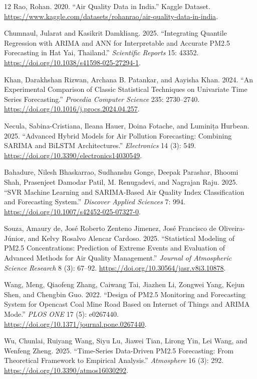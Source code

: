 \documentclass[11pt]{article}
\begin{document}
\begin{thebibliography}{12}
 Rao, Rohan. 2020. ``Air Quality Data in India.'' Kaggle Dataset. \url{https://www.kaggle.com/datasets/rohanrao/air-quality-data-in-india}.

 Chumnaul, Jularat and Kasikrit Damkliang. 2025. ``Integrating Quantile Regression with ARIMA and ANN for Interpretable and Accurate PM2.5 Forecasting in Hat Yai, Thailand.'' \textit{Scientific Reports} 15: 43352. \url{https://doi.org/10.1038/s41598-025-27294-1}.

 Khan, Darakhshan Rizwan, Archana B. Patankar, and Aayisha Khan. 2024. ``An Experimental Comparison of Classic Statistical Techniques on Univariate Time Series Forecasting.'' \textit{Procedia Computer Science} 235: 2730--2740. \url{https://doi.org/10.1016/j.procs.2024.04.257}.

 Necula, Sabina-Cristiana, Ileana Hauer, Doina Fotache, and Luminița Hurbean. 2025. ``Advanced Hybrid Models for Air Pollution Forecasting: Combining SARIMA and BiLSTM Architectures.'' \textit{Electronics} 14 (3): 549. \url{https://doi.org/10.3390/electronics14030549}.

 Bahadure, Nilesh Bhaskarrao, Sudhanshu Gonge, Deepak Parashar, Bhoomi Shah, Prasenjeet Damodar Patil, M. Renugadevi, and Nagrajan Raju. 2025. ``SVR Machine Learning and SARIMA-Based Air Quality Index Classification and Forecasting System.'' \textit{Discover Applied Sciences} 7: 994. \url{https://doi.org/10.1007/s42452-025-07327-0}.

 Souza, Amaury de, José Roberto Zenteno Jimenez, José Francisco de Oliveira-Júnior, and Kelvy Rosalvo Alencar Cardoso. 2025. ``Statistical Modeling of PM2.5 Concentrations: Prediction of Extreme Events and Evaluation of Advanced Methods for Air Quality Management.'' \textit{Journal of Atmospheric Science Research} 8 (3): 67--92. \url{https://doi.org/10.30564/jasr.v8i3.10878}.

 Wang, Meng, Qiaofeng Zhang, Caiwang Tai, Jiazhen Li, Zongwei Yang, Kejun Shen, and Chengbin Guo. 2022. ``Design of PM2.5 Monitoring and Forecasting System for Opencast Coal Mine Road Based on Internet of Things and ARIMA Mode.'' \textit{PLOS ONE} 17 (5): e0267440. \url{https://doi.org/10.1371/journal.pone.0267440}.

 Wu, Chunlai, Ruiyang Wang, Siyu Lu, Jiawei Tian, Lirong Yin, Lei Wang, and Wenfeng Zheng. 2025. ``Time-Series Data-Driven PM2.5 Forecasting: From Theoretical Framework to Empirical Analysis.'' \textit{Atmosphere} 16 (3): 292. \url{https://doi.org/10.3390/atmos16030292}.


\end{thebibliography}
\end{document}
